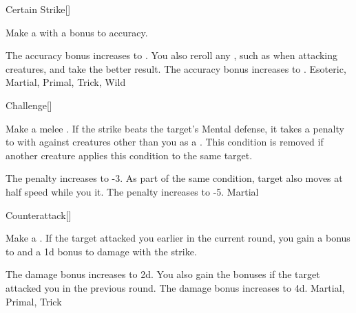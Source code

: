 \lowercase{\hypertarget{maneuver:Certain Strike}{}}\label{maneuver:Certain Strike}
\hypertarget{maneuver:Certain Strike}{}
\begin{freeability}[Rank 1]{Certain Strike}[]

Make a  with a  bonus to accuracy.

\rankline
{} The accuracy bonus increases to .
 You also reroll any , such as when attacking  creatures, and take the better result.
 The accuracy bonus increases to .
 Esoteric, Martial, Primal, Trick, Wild
\end{freeability}
\vspace{0.25em}



\lowercase{\hypertarget{maneuver:Challenge}{}}\label{maneuver:Challenge}
\hypertarget{maneuver:Challenge}{}
\begin{freeability}[Rank 1]{Challenge}[]

Make a melee .
If the strike beats the target's Mental defense, it takes a  penalty to  with  against creatures other than you as a .
This condition is removed if another creature applies this condition to the same target.

\rankline
{} The penalty increases to -3.
 As part of the same condition, target also moves at half speed while you  it.
 The penalty increases to -5.
 Martial
\end{freeability}
\vspace{0.25em}



\lowercase{\hypertarget{maneuver:Counterattack}{}}\label{maneuver:Counterattack}
\hypertarget{maneuver:Counterattack}{}
\begin{freeability}[Rank 1]{Counterattack}[]

Make a .
If the target attacked you earlier in the current round, you gain a  bonus to  and a \plus1d bonus to damage with the strike.

\rankline
{} The damage bonus increases to \plus2d.
 You also gain the bonuses if the target attacked you in the previous round.
 The damage bonus increases to \plus4d.
 Martial, Primal, Trick
\end{freeability}
\vspace{0.25em}




